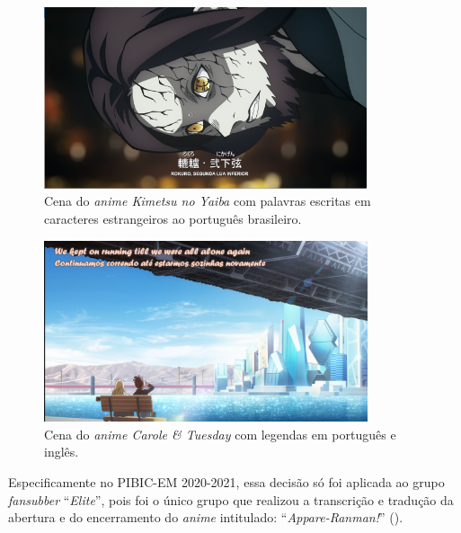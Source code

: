 \documentclass[portuguese]{textolivre}
\begin{document}
\begin{figure}[htbp]
 \centering
 \includegraphics[width=0.85\textwidth]{Fig10.png}
 \caption{Cena do \textit{anime Kimetsu no Yaiba} com palavras escritas em caracteres estrangeiros ao português brasileiro.}
 \label{fig10}
\end{figure}

\begin{figure}[htbp]
 \centering
 \includegraphics[width=0.85\textwidth]{Fig11.png}
 \caption{Cena do \textit{anime Carole \& Tuesday} com legendas em português e inglês.}
 \label{fig11}
\end{figure}

Especificamente no PIBIC-EM 2020-2021, essa decisão só foi aplicada ao grupo \textit{fansubber} “\textit{Elite}”, pois foi o único grupo que realizou a transcrição e tradução da abertura e do encerramento do \textit{anime} intitulado: “\textit{Appare-Ranman!}” ().
\end{document}
